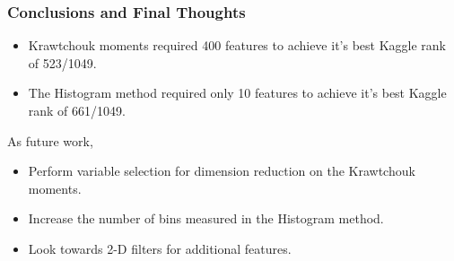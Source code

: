 \documentclass{beamer}
\begin{document}

\begin{frame}
	\frametitle{Conclusions and Final Thoughts}
	\begin{itemize}
		\item Krawtchouk moments required 400 features to achieve it's best Kaggle rank of 523/1049.
		\item The Histogram method required only 10 features to achieve it's best Kaggle rank of 661/1049.
	\end{itemize}
As future work, 
	\begin{itemize}
		\item Perform variable selection for dimension reduction on the Krawtchouk moments.
		\item Increase the number of bins measured in the Histogram method.
		\item Look towards 2-D filters for additional features.
	\end{itemize}
\end{frame}
\end{document}
